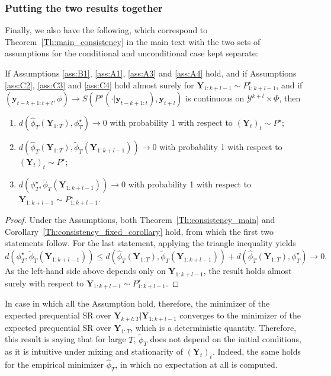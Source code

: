 \documentclass[twoside,11pt]{article}
\newcommand{\ddobs}{\mathbf{y}}
\newcommand{\Ddobs}{\mathbf{Y}}
\newcommand{\DdobsupT}{\mathbf{Y}_{1:T}}
\newcommand{\Ddobsupkplusl}{\mathbf{Y}_{1:k+l-1}}
\newcommand{\DdobsupTfromk}{\mathbf{Y}_{k+l:T}}
\begin{document}
	\subsubsection{Putting the two results together}
	Finally, we also have the following, which correspond to Theorem~\ref{Th:main_consistency} in the main text with the two sets of assumptions for the conditional and unconditional case kept separate:
	\begin{corollary}
		If Assumptions \ref{ass:B1}, \ref{ass:A1}, \ref{ass:A3} and \ref{ass:A4} hold, and if Assumptions \ref{ass:C2}, \ref{ass:C3} and \ref{ass:C4} hold almost surely for $ \Ddobsupkplusl \sim P^\star_{1:k+l-1}$, and if $ (\ddobs_{t-k+1:t+l}, \phi) \to S(P^\phi(\cdot|\ddobs_{t-k+1:t}), \ddobs_{t+l}) $ is continuous on $ \mathcal{Y}^{k+l} \times \Phi $, then
		\begin{enumerate}
			\item  $ d(\hat \phi_T(\DdobsupT), \phi^\star_T) \to 0 $ with probability 1 with respect to $ (\Ddobs_t)_t  \sim P^\star $;
			\item $ d(\hat \phi_T(\DdobsupT), \tilde\phi_T(\Ddobsupkplusl)) \to 0 $ with probability 1 with respect to $ (\Ddobs_t)_t  \sim P^\star $;
			\item $ d(\phi^\star_T, \tilde\phi_T(\Ddobsupkplusl)) \to 0 $ with probability 1 with respect to $ \Ddobsupkplusl\sim P^\star_{1:k+l-1} $.
		\end{enumerate} 
	\end{corollary}
	\begin{proof}
		Under the Assumptions, both Theorem~\ref{Th:consistency_main} and Corollary~\ref{Th:consistency_fixed_corollary} hold, from which the first two statements follow. For the last statement, applying the triangle inequality yields
		\begin{equation}\label{key}
		d(\phi^\star_T, \tilde\phi_T(\Ddobsupkplusl)) \le d(\hat \phi_T(\DdobsupT), \tilde\phi_T(\Ddobsupkplusl)) +  d(\hat \phi_T(\DdobsupT), \phi^\star_T)  \to 0.
		\end{equation}As the left-hand side above depends only on $ \Ddobsupkplusl $, the result holds almost surely with respect to $ \Ddobsupkplusl\sim P^\star_{1:k+l-1} $.
	\end{proof}
	
	In case in which all the Assumption hold, therefore, the minimizer of the expected prequential SR over $ \DdobsupTfromk|\Ddobsupkplusl $ converges to the minimizer of the expected prequential SR over $ \DdobsupT $, which is a deterministic quantity. Therefore, this result is saying that for large $ T $, $ \tilde \phi_T $ does not depend on the initial conditions, as it is intuitive under mixing and stationarity of $ (\Ddobs_t)_t $. Indeed, the same holds for the empirical minimizer $ \hat \phi_T $, in which no expectation at all is computed.
	
\end{document}
